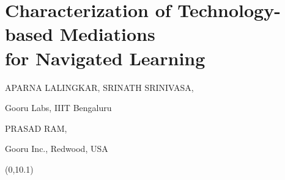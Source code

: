 \chapter{Characterization of Technology-based Mediations\\ for Navigated Learning}

\begin{center}
{\large\uppercase{APARNA LALINGKAR, SRINATH SRINIVASA}}, 

\vskip -6pt

Gooru Labs, IIIT Bengaluru

\bigskip
{\large\uppercase{PRASAD RAM,}} 

\vskip -6pt

Gooru Inc., Redwood, USA
\end{center}


\begin{textblock}{16}(0,10.1)
\noindent{}
\end{textblock}


\newpage

